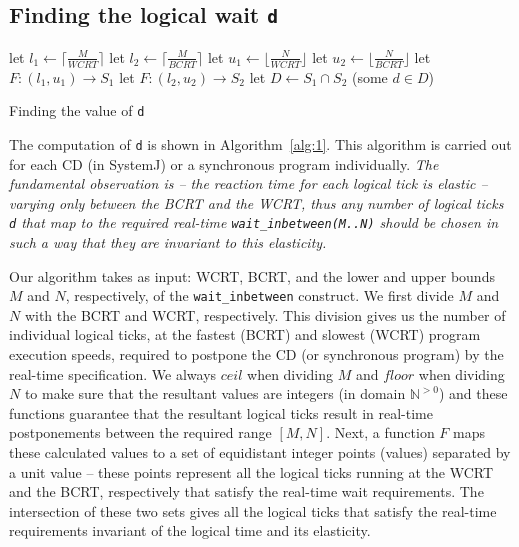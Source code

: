 \subsection{Finding the logical wait \texttt{d}}
\label{sec:find-logic-delay}

\begin{algorithm}[t!]
  \begin{minipage}{1.0\linewidth}
    \SetAlgoLined
    let $l_1 \leftarrow \lceil \frac{M}{WCRT} \rceil$\;
    let $l_2 \leftarrow \lceil \frac{M}{BCRT} \rceil$\;
    let $u_1 \leftarrow \lfloor \frac{N}{WCRT} \rfloor$\;
    let $u_2 \leftarrow \lfloor \frac{N}{BCRT} \rfloor$\;
    let $F:(l_1,u_1) \rightarrow S_1$\;
    let $F:(l_2,u_2) \rightarrow S_2$\;
    let $D \leftarrow S_1 \cap S_2$\;
    \Return (some $d \in D$)\;
    \caption{Finding the value of \texttt{d}}
    \label{alg:1}
  \end{minipage}
\end{algorithm}

The computation of \texttt{d} is shown in Algorithm~\ref{alg:1}. This
algorithm is carried out for each CD (in SystemJ) or a synchronous
program individually. \textit{The fundamental observation is -- the
	reaction time for each logical tick is elastic -- varying only between
	the BCRT and the WCRT, thus any number of logical ticks \texttt{d}
	that map to the required real-time
	\mbox{\texttt{wait\_inbetween(M..N)}} should be chosen in such a way
	that they are invariant to this elasticity.}

Our algorithm takes as input: WCRT, BCRT, and the lower and upper bounds
$M$ and $N$, respectively, of the \texttt{wait\_inbetween} construct. We
first divide $M$ and $N$ with the BCRT and WCRT, respectively. This
division gives us the number of individual logical ticks, at the fastest
(BCRT) and slowest (WCRT) program execution speeds, required to postpone
the CD (or synchronous program) by the real-time specification. We
always $ceil$ when dividing $M$ and $floor$ when dividing $N$ to make
sure that the resultant values are integers (in domain
$\mathbb{N}^{>0}$) and these functions guarantee that the resultant
logical ticks result in real-time postponements between the required
range $[M,N]$. Next, a function $F$ maps these calculated values to a
set of equidistant integer points (values) separated by a unit value --
these points represent all the logical ticks running at the WCRT and the
BCRT, respectively that satisfy the real-time wait requirements. The
intersection of these two sets gives all the logical ticks that satisfy
the real-time requirements invariant of the logical time and its
elasticity.

